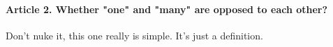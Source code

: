 \documentclass{ucetd}
\begin{document}
\paragraph{Article 2. Whether "one" and "many" are opposed to each other?}
Don't nuke it, this one really is simple. It's just a definition.
\end{document}
